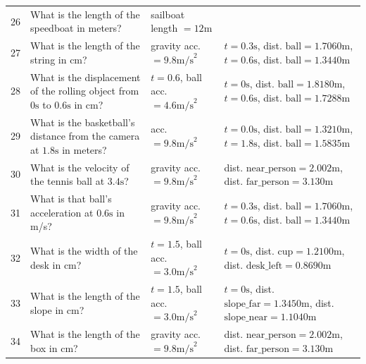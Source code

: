 \begin{tabular}{@{} c L{7.5cm} L{4.0cm} L{3.0cm} @{}}
26 & What is the length of the speedboat in meters? & sailboat length $= 12\text{m}$ & \\
27 & What is the length of the string in cm? & gravity acc. $= 9.8 \text{m/s}^2$ & $t=0.3\text{s}$, dist. $\text{ball} = 1.7060\text{m}$, $t=0.6\text{s}$, dist. $\text{ball} = 1.3440\text{m}$ \\
28 & What is the displacement of the rolling object from $0\text{s}$ to $0.6\text{s}$ in cm? & $t=0.6$, ball acc. $= 4.6\text{m/s}^2$ & $t=0\text{s}$, dist. $\text{ball} = 1.8180\text{m}$, $t=0.6\text{s}$, dist. $\text{ball} = 1.7288\text{m}$ \\
29 & What is the basketball's distance from the camera at $1.8\text{s}$ in meters? & acc. $= 9.8 \text{m/s}^2$ & $t=0.0\text{s}$, dist. $\text{ball} = 1.3210\text{m}$, $t=1.8\text{s}$, dist. $\text{ball} = 1.5835\text{m}$ \\
30 & What is the velocity of the tennis ball at $3.4\text{s}$? & gravity acc. $= 9.8\text{m/s}^2$ & dist. $\text{near\_person} = 2.002\text{m}$, dist. $\text{far\_person} = 3.130\text{m}$ \\
31 & What is that ball's acceleration at $0.6\text{s}$ in m/s? & gravity acc. $= 9.8 \text{m/s}^2$ & $t=0.3\text{s}$, dist. $\text{ball} = 1.7060\text{m}$, $t=0.6\text{s}$, dist. $\text{ball} = 1.3440\text{m}$ \\
32 & What is the width of the desk in cm? & $t=1.5$, ball acc. $= 3.0\text{m/s}^2$ & $t=0\text{s}$, dist. $\text{cup} = 1.2100\text{m}$, dist. $\text{desk\_left} = 0.8690\text{m}$ \\
33 & What is the length of the slope in cm? & $t=1.5$, ball acc. $= 3.0\text{m/s}^2$ & $t=0\text{s}$, dist. $\text{slope\_far} = 1.3450\text{m}$, dist. $\text{slope\_near} = 1.1040\text{m}$ \\
34 & What is the length of the box in cm? & gravity acc. $= 9.8\text{m/s}^2$ & dist. $\text{near\_person} = 2.002\text{m}$, dist. $\text{far\_person} = 3.130\text{m}$ \\
\bottomrule
\end{tabular}

